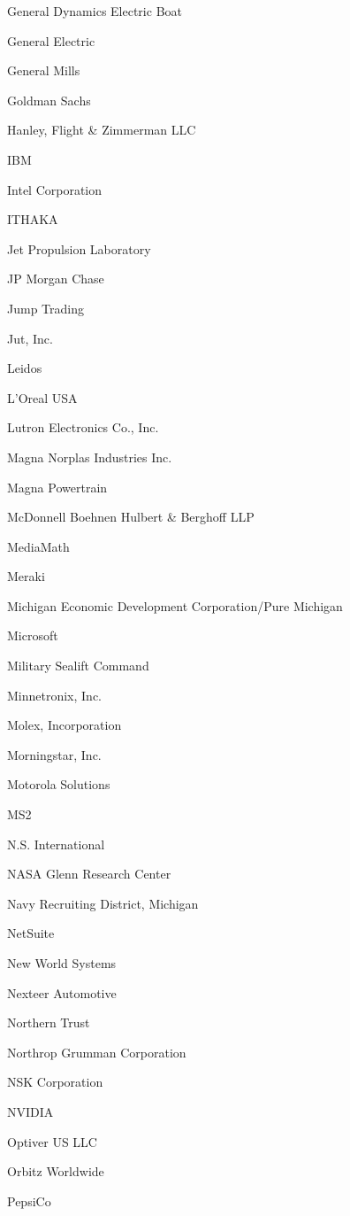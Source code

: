 \documentclass[twoside]{article}
\begin{document}
\begin{center}
\begin{multicols}{5}
\begin{FlushLeft}
\begin{compactitem}
\item General Dynamics Electric Boat
\item General Electric
\item General Mills
\item Goldman Sachs
\item Hanley, Flight \& Zimmerman LLC
\item IBM
\item Intel Corporation
\item ITHAKA
\item Jet Propulsion Laboratory
\item JP Morgan Chase
\item Jump Trading
\item Jut, Inc.
\item Leidos
\item L'Oreal USA
\item Lutron Electronics Co., Inc.
\item Magna Norplas Industries Inc.
\item Magna Powertrain
\item McDonnell Boehnen Hulbert \& Berghoff LLP
\item MediaMath
\item Meraki
\item Michigan Economic Development Corporation/Pure Michigan
\item Microsoft
\item Military Sealift Command
\item Minnetronix, Inc.
\item Molex, Incorporation
\item Morningstar, Inc.
\item Motorola Solutions
\item MS2
\item N.S. International
\item NASA Glenn Research Center
\item Navy Recruiting District, Michigan
\item NetSuite
\item New World Systems
\item Nexteer Automotive
\item Northern Trust
\item Northrop Grumman Corporation
\item NSK Corporation
\item NVIDIA
\item Optiver US LLC
\item Orbitz Worldwide
\item PepsiCo

\end{compactitem}
\end{FlushLeft}
\end{multicols}
\end{center}
\end{document}
